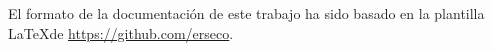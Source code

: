 \newpage
\thispagestyle{empty}

\begin{center}

\vspace*{\fill}

El formato de la documentación de este trabajo ha sido basado en la plantilla \LaTeX\space de \href{https://github.com/erseco}{https://github.com/erseco}.

\end{center}
